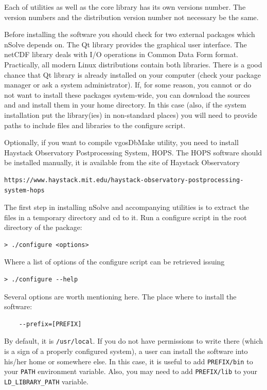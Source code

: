 \documentclass [10pt,letterpaper]{report}
\newcommand{\nuSolve}{\greektext n\latintext Solve}
\begin{document}
{%

Each of utilities as well as the core library has its own versions
number. The version numbers and the distribution version number not
necessary be the same.

Before installing the software you should check for two external packages
which \nuSolve{} depends on. The Qt library provides the graphical user
interface. The netCDF library deals with I/O operations in Common Data
Form format. Practically, all modern Linux distributions contain both
libraries. There is a good chance that Qt library is already installed on
your computer (check your package manager or ask a system administrator).
If, for some reason, you cannot or do not want to install these packages
system-wide, you can download the sources and and install them in your
home directory. In this case (also, if the system installation put the
library(ies) in non-standard places) you will need to provide paths to
include files and libraries to the configure script.

Optionally, if you want to compile vgosDbMake utility, you need to install
Haystack Observatory Postprocessing System, HOPS. The HOPS software should
be installed manually, it is available from the site of Haystack
Observatory
\begin{verbatim}
https://www.haystack.mit.edu/haystack-observatory-postprocessing-system-hops
\end{verbatim}

The first step in installing \nuSolve{} and accompanying utilities is to
extract the files in a temporary directory and cd to it. Run a configure
script in the root directory of the package:
\begin{verbatim}
> ./configure <options>
\end{verbatim}
\noindent
Where a list of options of the configure script can be retrieved issuing

\begin{verbatim}
> ./configure --help
\end{verbatim}
\noindent
Several options are worth mentioning here. The place where to install
the software:
\begin{verbatim}
    --prefix=[PREFIX]
\end{verbatim}
\noindent
By default, it is {\tt /usr/local}. If you do not have permissions to
write there (which is a sign of a properly configured system), a user
can install the software into his/her home or somewhere else. In this
case, it is useful to add {\tt PREFIX/bin} to your {\tt PATH}
environment variable. Also, you may need to add {\tt PREFIX/lib} to your
{\tt LD\_LIBRARY\_PATH} variable.

}
\end{document}
